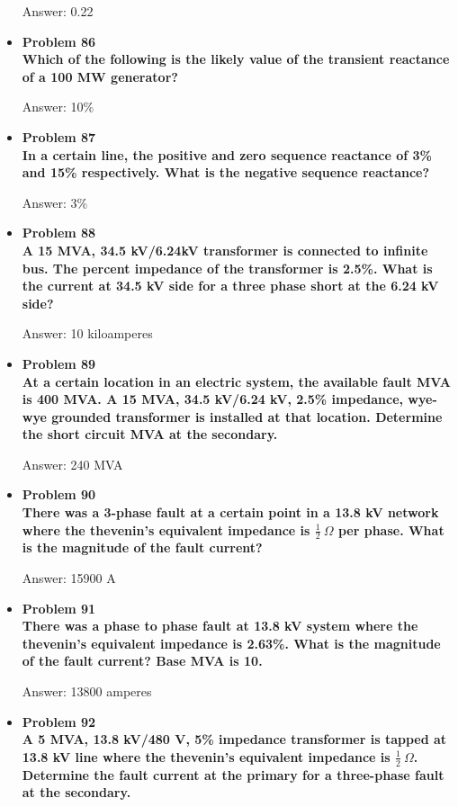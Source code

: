 \documentclass{article}
\begin{document}
\begin{center}
\begin{itemize}
    Answer: 0.22

    \item\textbf{Problem 86\\%
    Which of the following is the likely value of the transient reactance of a 100 MW generator?}

    Answer: 10\%

    \item\textbf{Problem 87\\%
    In a certain line, the positive and zero sequence reactance of 3\% and 15\% respectively. What is the negative sequence reactance?}

    Answer: 3\%

    \item\textbf{Problem 88\\%
    A 15 MVA, 34.5 kV/6.24kV transformer is connected to infinite bus. The percent impedance of the transformer is 2.5\%. What is the current at 34.5 kV side for a three phase short at the 6.24 kV side?}

    Answer: 10 kiloamperes
    
    \item\textbf{Problem 89\\%
    At a certain location in an electric system, the available fault MVA is 400 MVA. A 15 MVA, 34.5 kV/6.24 kV, 2.5\% impedance, wye-wye grounded transformer is installed at that location. Determine the short circuit MVA at the secondary.}

    Answer: 240 MVA

    \item\textbf{Problem 90\\%
    There was a 3-phase fault at a certain point in a 13.8 kV network where the thevenin's equivalent impedance is $\frac{1}{2}\ \Omega$ per phase. What is the magnitude of the fault current?}

    Answer: 15900 A

    \item\textbf{Problem 91\\%
    There was a phase to phase fault at 13.8 kV system where the thevenin's equivalent impedance is 2.63\%. What is the magnitude of the fault current? Base MVA is 10.}

    Answer: 13800 amperes

    \item\textbf{Problem 92\\%
    A 5 MVA, 13.8 kV/480 V, 5\% impedance transformer is tapped at 13.8 kV line where the thevenin's equivalent impedance is $\frac{1}{2}\ \Omega$. Determine the fault current at the primary for a three-phase fault at the secondary.}


\end{itemize}
\end{center}
\end{document}
